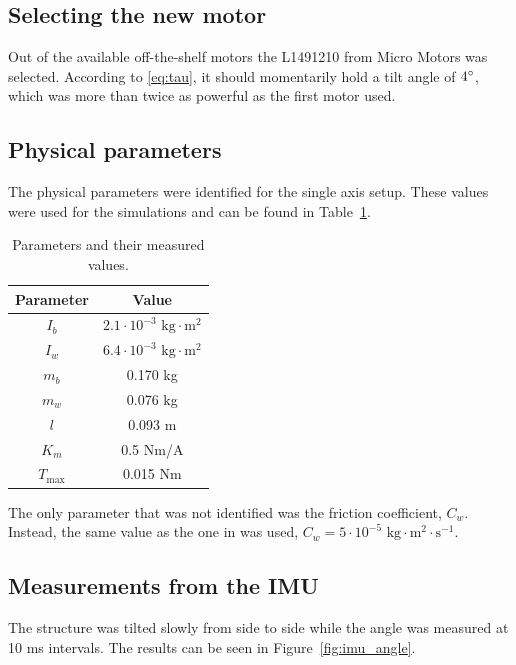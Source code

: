 \subsection{Selecting the new motor}
Out of the available off-the-shelf motors the L1491210\cite{motor-datasheet} from Micro Motors was selected. According to \eqref{eq:tau}, it should momentarily hold a tilt angle of $4\degree$, which was more than twice as powerful as the first motor used.

\subsection{Physical parameters}
The physical parameters were identified for the single axis setup. These values were used for the simulations and can be found in Table~\ref{table:MeasuredValues}.

\begin{table}[h]
    \centering
    \begin{tabular}{cc}\toprule
            Parameter  & Value \\\midrule
            $I_{b}$      & $2.1 \cdot 10^{-3} \text{ kg} \cdot \text{m}^2$ \\
            $I_{w}$      & $6.4 \cdot 10^{-3} \text{ kg} \cdot \text{m}^2$ \\
            $m_{b}$      & 0.170 kg \\
            $m_{w}$      & 0.076 kg \\
            $l$            & 0.093 m \\
            $K_{m}$      & 0.5 Nm/A \\
            $T_{\text{max}}$    & 0.015 Nm \\\bottomrule
    \end{tabular}
    \caption{Parameters and their measured values.}
    \label{table:MeasuredValues}
\end{table}

\noindent
The only parameter that was not identified was the friction coefficient, $C_{w}$. Instead, the same value as the one in \cite{cubli-planar} was used, $C_{w} = 5 \cdot 10^{-5} \text{ kg} \cdot \text{m}^2 \cdot \text{s}^{-1}$.

\subsection{Measurements from the IMU}
The structure was tilted slowly from side to side while the angle was measured at 10 ms intervals. The results can be seen in Figure~\ref{fig:imu_angle}.


